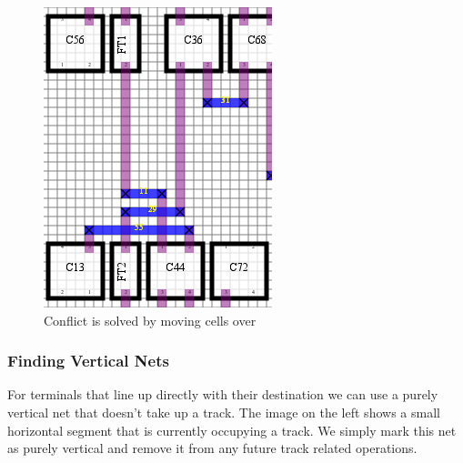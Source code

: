 \documentclass[10pt]{article}
\begin{document}
\begin{figure}[H]
\begin{minipage}{.5\textwidth}
                \includegraphics[width=0.75\linewidth]{./route_2_crop.png}
                \caption{Conflict is solved by moving cells over}
            \end{minipage}
        \end{figure}

    \subsubsection{Finding Vertical Nets}

        For terminals that line up directly with their destination we can use a
        purely vertical net that doesn't take up a track. The image on the left
        shows a small horizontal segment that is currently occupying a track.
        We simply mark this net as purely vertical and remove it from any
        future track related operations.
\end{document}
